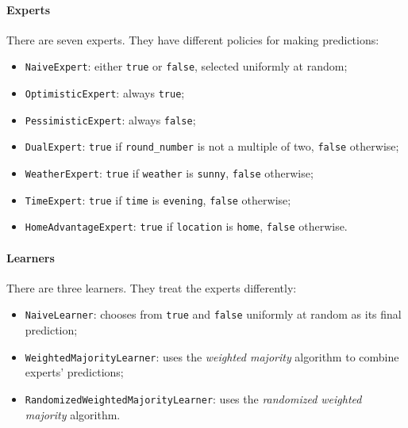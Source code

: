 \documentclass{article}
\begin{document}
\paragraph{Experts} There are seven experts. They have different policies for making predictions: 
\begin{itemize}\itemsep-1pt
	\item {\tt NaiveExpert}: either {\tt true} or {\tt false}, selected uniformly at random; 
	\item {\tt OptimisticExpert}: always {\tt true}; 
	\item {\tt PessimisticExpert}: always {\tt false}; 
	\item {\tt DualExpert}: {\tt true} if {\tt round\_number} is not a multiple of two, {\tt false} otherwise;
	\item {\tt WeatherExpert}: {\tt true} if {\tt weather} is {\tt sunny}, {\tt false} otherwise; 
	\item {\tt TimeExpert}: {\tt true} if {\tt time} is {\tt evening}, {\tt false} otherwise; 
	\item {\tt HomeAdvantageExpert}: {\tt true} if {\tt location} is {\tt home}, {\tt false} otherwise. 
\end{itemize}

\paragraph{Learners} There are three learners. They treat the experts differently: 
\begin{itemize}\itemsep-1pt
	\item {\tt NaiveLearner}: chooses from {\tt true} and {\tt false} uniformly at random as its final prediction; 
	\item {\tt WeightedMajorityLearner}: uses the {\it weighted majority} algorithm to combine experts' predictions;
	\item {\tt RandomizedWeightedMajorityLearner}: uses the {\it randomized weighted majority} algorithm. 
\end{itemize}
\end{document}
